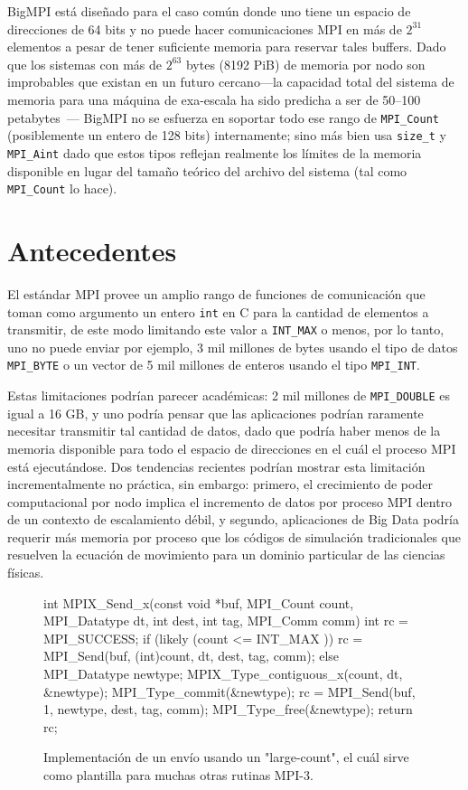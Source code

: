 \documentclass[conference]{IEEEtran}
\begin{document}
BigMPI está diseñado para el caso común donde uno tiene un espacio de direcciones de 64 bits
y no puede hacer comunicaciones MPI en más de $2^{31}$ elementos a pesar de tener suficiente
memoria para reservar tales buffers. Dado que los sistemas con más de $2^{63}$ bytes (8192 PiB)
de memoria por nodo son improbables que existan en un futuro cercano---la capacidad total del
sistema de memoria para una máquina de exa-escala ha sido predicha a ser de 50--100
petabytes~\cite{shalf2011exascale}---
BigMPI no se esfuerza en soportar todo ese rango de \texttt{MPI\_Count}
(posiblemente un entero de 128 bits) internamente; sino más bien
usa \texttt{size\_t} y \texttt{MPI\_Aint} dado que estos tipos
reflejan realmente los límites de la memoria disponible en lugar del tamaño teórico del
archivo del sistema (tal como \texttt{MPI\_Count} lo hace).

\section{Antecedentes}
El estándar MPI provee un amplio rango de funciones de comunicación que toman como argumento
un entero \texttt{int} en C para la cantidad de elementos a transmitir, de este modo limitando
este valor a \texttt{INT\_MAX} o menos, por lo tanto, uno no puede enviar por ejemplo, 3 mil
millones de bytes usando el tipo de datos \texttt{MPI\_BYTE} o un vector de 5 mil millones de
enteros usando el tipo \texttt{MPI\_INT}.

Estas limitaciones podrían parecer académicas: 2 mil millones de \texttt{MPI\_DOUBLE} es igual
a 16 GB, y uno podría pensar que las aplicaciones podrían raramente necesitar transmitir tal
cantidad de datos, dado que podría haber menos de la memoria disponible para todo el espacio
de direcciones en el cuál el proceso MPI está ejecutándose. Dos tendencias recientes podrían
mostrar esta limitación incrementalmente no práctica, sin embargo: primero, el crecimiento de
poder computacional por nodo implica el incremento de datos por proceso MPI dentro de un contexto
de escalamiento débil, y segundo, aplicaciones de Big Data podría requerir más memoria por proceso
que los códigos de simulación tradicionales que resuelven la ecuación de movimiento para un
dominio particular de las ciencias físicas.

\begin{figure}
\begin{code}
int MPIX_Send_x(const void *buf, MPI_Count count,
                MPI_Datatype dt, int dest,
                int tag, MPI_Comm comm)
{
    int rc = MPI_SUCCESS;
    if (likely (count <= INT_MAX )) {
        rc = MPI_Send(buf, (int)count, dt, dest, tag, comm);
    } else {
        MPI_Datatype newtype;
        MPIX_Type_contiguous_x(count, dt, &newtype);
        MPI_Type_commit(&newtype);
        rc = MPI_Send(buf, 1, newtype, dest, tag, comm);
        MPI_Type_free(&newtype);
    }
    return rc;
}
\end{code}
\caption{Implementación de un envío usando un "large-count", el cuál sirve como plantilla
para muchas otras rutinas MPI-3.\label{code:mpi_send_x}}
\end{figure}
\end{document}
